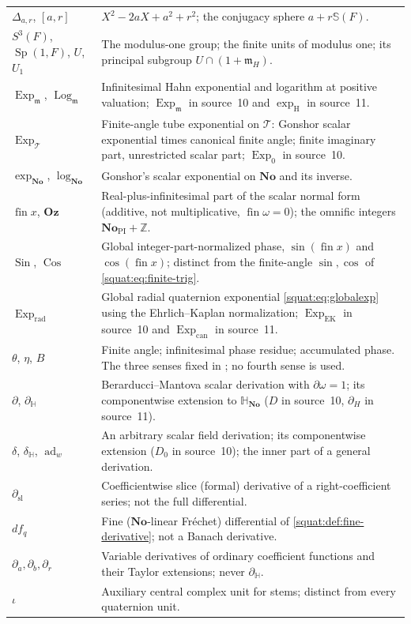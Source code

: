 \documentclass[11pt,letterpaper]{article}
\numberwithin{equation}{section}
\theoremstyle{definition}
\theoremstyle{remark}
\newcommand{\No}{\mathbf{No}}
\newcommand{\SQ}{\mathbb H_{\No}}
\newcommand{\Z}{\mathbb Z}
\newcommand{\mm}{\mathfrak m}
\newcommand{\Oz}{\mathbf{Oz}}
\newcommand{\fin}{\operatorname{fin}}
\newcommand{\Sp}{\operatorname{Sp}}
\newcommand{\ad}{\operatorname{ad}}
\newcommand{\Exp}{\operatorname{Exp}}
\newcommand{\Log}{\operatorname{Log}}
\newcommand{\Expm}{\Exp_{\mm}}
\newcommand{\Logm}{\Log_{\mm}}
\newcommand{\Expt}{\Exp_{\mathcal T}}
\newcommand{\Expr}{\Exp_{\mathrm{rad}}}
\newcommand{\Sin}{\operatorname{Sin}}
\newcommand{\Cos}{\operatorname{Cos}}
\newcommand{\dsl}{\partial_{\mathrm{sl}}}
\newcommand{\dH}{\partial_{\mathbb H}}
\newcommand{\delH}{\delta_{\mathbb H}}
\begin{document}
\begin{longtable}{L{0.21\textwidth}L{0.71\textwidth}}
$\Delta_{a,r}$, $[a,r]$ & $X^2-2aX+a^2+r^2$; the conjugacy sphere $a+r\mathbb S(F)$.\\
$S^3(F)$, $\Sp(1,F)$, $U$, $U_1$ & The modulus-one group; the finite units of modulus one;
its principal subgroup $U\cap(1+\mm_H)$.\\
$\Expm$, $\Logm$ & Infinitesimal Hahn exponential and logarithm at positive valuation;
$\Exp_{\mm}$ in source~10 and $\exp_{\mathrm H}$ in source~11.\\
$\Expt$ & Finite-angle tube exponential on $\mathcal T$: Gonshor scalar exponential times
canonical finite angle; finite imaginary part, unrestricted scalar part; $\Exp_0$ in
source~10.\\
$\exp_{\No}$, $\log_{\No}$ & Gonshor's scalar exponential on $\No$ and its inverse.\\
$\fin x$, $\Oz$ & Real-plus-infinitesimal part of the scalar normal form (additive, not
multiplicative, $\fin\omega=0$); the omnific integers $\No_{\mathrm{PI}}+\Z$.\\
$\Sin$, $\Cos$ & Global integer-part-normalized phase, $\sin(\fin x)$ and $\cos(\fin x)$;
distinct from the finite-angle $\sin,\cos$ of \cref{squat:eq:finite-trig}.\\
$\Expr$ & Global radial quaternion exponential \cref{squat:eq:globalexp} using the
Ehrlich--Kaplan normalization; $\Exp_{\mathrm{EK}}$ in source~10 and
$\Exp_{\mathrm{can}}$ in source~11.\\
$\theta$, $\eta$, $B$ & Finite angle; infinitesimal phase residue; accumulated phase. The
three senses fixed in \cite{RepoDiff}; no fourth sense is used.\\
$\partial$, $\dH$ & Berarducci--Mantova scalar derivation with $\partial\omega=1$; its
componentwise extension to $\SQ$ ($D$ in source~10, $\partial_H$ in source~11).\\
$\delta$, $\delH$, $\ad_w$ & An arbitrary scalar field derivation; its componentwise
extension ($D_0$ in source~10); the inner part of a general derivation.\\
$\dsl$ & Coefficientwise slice (formal) derivative of a right-coefficient series; not the
full differential.\\
$df_q$ & Fine ($\No$-linear Fr\'echet) differential of
\cref{squat:def:fine-derivative}; not a Banach derivative.\\
$\partial_a,\partial_b,\partial_r$ & Variable derivatives of ordinary coefficient functions
and their Taylor extensions; never $\dH$.\\
$\iota$ & Auxiliary central complex unit for stems; distinct from every quaternion unit.\\

\end{longtable}
\end{document}
